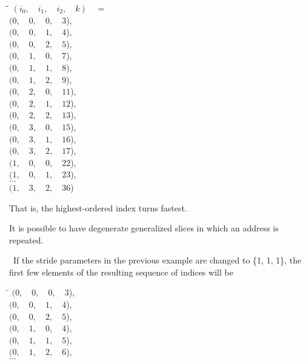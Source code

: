 \documentclass[american,twoside]{book}
\begin{document}
\begin{paras}
\begin{tabbing}
\hspace{.5in}\=\hspace{.4in}\=\kill%
\>$(i_0,\quad i_1,\quad i_2,\quad k)\quad =$\\
\>\>$(0,\quad 0,\quad 0,\quad 3$),		\\
\>\>$(0,\quad 0,\quad 1,\quad 4$),		\\
\>\>$(0,\quad 0,\quad 2,\quad 5$),		\\
\>\>$(0,\quad 1,\quad 0,\quad 7$),		\\
\>\>$(0,\quad 1,\quad 1,\quad 8$),		\\
\>\>$(0,\quad 1,\quad 2,\quad 9$),		\\
\>\>$(0,\quad 2,\quad 0,\quad 11$),	\\
\>\>$(0,\quad 2,\quad 1,\quad 12$),	\\
\>\>$(0,\quad 2,\quad 2,\quad 13$),	\\
\>\>$(0,\quad 3,\quad 0,\quad 15$),	\\
\>\>$(0,\quad 3,\quad 1,\quad 16$),	\\
\>\>$(0,\quad 3,\quad 2,\quad 17$),	\\
\>\>$(1,\quad 0,\quad 0,\quad 22$),	\\
\>\>$(1,\quad 0,\quad 1,\quad 23$),	\\
\>\>$\ldots$			\\
\>\>$(1,\quad 3,\quad 2,\quad 36$)
\end{tabbing}

That is, the highest-ordered index turns fastest.
\exitexample\ 

\pnum
It is possible to have degenerate generalized slices in which an address
is repeated.

\pnum
\enterexample\ 
If the stride parameters in the previous
example are changed to \{1, 1, 1\}, the first few elements of the
resulting sequence of indices will be

\begin{tabbing}
\hspace{.9in}\=\kill%
\>$(0,\quad 0,\quad 0,\quad 3$),	\\
\>$(0,\quad 0,\quad 1,\quad 4$),	\\
\>$(0,\quad 0,\quad 2,\quad 5$),	\\
\>$(0,\quad 1,\quad 0,\quad 4$),	\\
\>$(0,\quad 1,\quad 1,\quad 5$),	\\
\>$(0,\quad 1,\quad 2,\quad 6$),	\\
\>$\ldots$
\end{tabbing}
\exitexample\ 


\end{paras}
\end{document}
